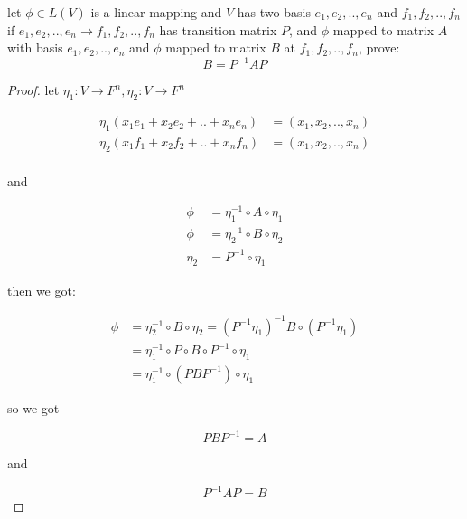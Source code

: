 \begin{exercise}
    let $\phi \in L(V)$ is a linear mapping and $V$ has two basis $e_1, e_2, .., e_n$ and $f_1,f_2,..,f_n$
    if $e_1,e_2,..,e_n \to f_1,f_2,..,f_n$ has transition matrix $P$, and $\phi$ mapped to matrix $A$ with basis $e_1,e_2,..,e_n$
    and $\phi$ mapped to matrix $B$ at $f_1,f_2,..,f_n$, prove:
    \[
        B = P^{-1}AP
    \]
\end{exercise}

\begin{proof}
   let $\eta_1: V \to F^n, \eta_2: V \to F^n$

   \begin{align*}
    \eta_1(x_1e_1 + x_2e_2 + .. + x_ne_n) &= (x_1,x_2,..,x_n) \\
    \eta_2(x_1f_1 + x_2f_2 + .. + x_nf_n) &= (x_1,x_2,..,x_n) \\
   \end{align*}

   and

   \begin{align*}
    \phi &=  \eta_1^{-1} \circ A \circ \eta_1 \\
    \phi &= \eta_2^{-1} \circ B \circ \eta_2 \\
    \eta_2 & = P^{-1} \circ \eta_1 
   \end{align*}

   then we got:

   \begin{align*}
    \phi &= \eta_2^{-1} \circ B \circ \eta_2 =(P^{-1} \eta_1)^{-1} B \circ (P^{-1} \eta_ 1) \\
    &= \eta_1^{-1} \circ P \circ B \circ P^{-1} \circ \eta_1 \\
    &= \eta_1^{-1} \circ (P B  P^{-1}) \circ \eta_1
   \end{align*}

   so we got

   \[
    PBP^{-1} = A
   \]

   and

   \[
    P^{-1}AP = B
   \]
\end{proof}

